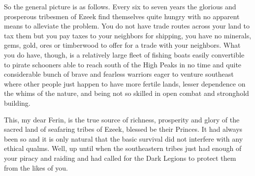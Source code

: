 {%


So the general picture is as follows. Every six to seven years the glorious and prosperous tribesmen of Ezeek find themselves quite hungry with no apparent means to alleviate the problem. You do not have trade routes across your land to tax them but you pay taxes to your neighbors for shipping, you have no minerals, gems, gold, ores or timberwood to offer for a trade with your neighbors. What you do have, though, is a relatively large fleet of fishing boats easily convertible to pirate schooners able to reach south of the High Peaks in no time and quite considerable bunch of brave and fearless warriors eager to venture southeast where other people just happen to have more fertile lands, lesser dependence on the whims of the nature, and being not so skilled in open combat and stronghold building.

This, my dear Ferin, is the true source of richness, prosperity and glory of the sacred land of seafaring tribes of Ezeek, blessed be their Princes. It had always been so and it is only natural that the basic survival did not interfere with any ethical qualms. Well, up until when the southeastern tribes just had enough of your piracy and raiding and had called for the Dark Legions to protect them from the likes of you.}

